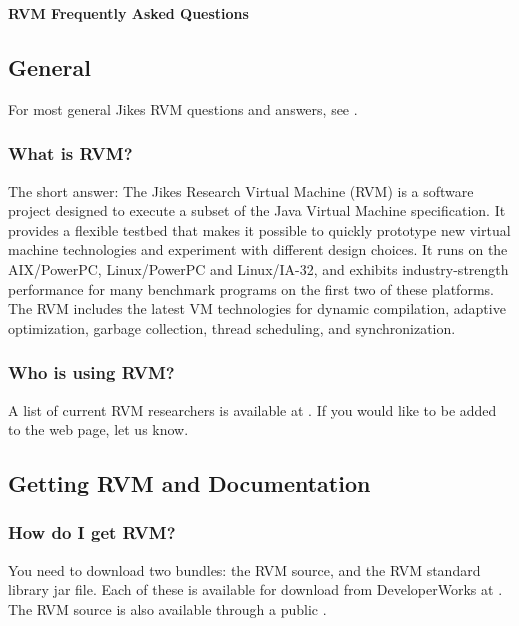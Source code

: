 \begin{center}
{\bf RVM Frequently Asked Questions}
\end{center}

\subsection{General}

For most general Jikes RVM questions and answers, see
\xlink{{\tt \QandAURL}}{\QandAURL}.

\subsubsection{What is RVM?}

The short answer:
The Jikes Research Virtual Machine (RVM) is a software project designed to 
execute a subset of the Java Virtual Machine specification.  It provides a
flexible testbed that makes it possible to quickly prototype new
virtual machine technologies and experiment with different design
choices.  It runs on the AIX/PowerPC, Linux/PowerPC and Linux/IA-32,
and exhibits industry-strength performance for many benchmark programs
on the first two of these platforms.  The RVM includes the latest VM
technologies for dynamic compilation, adaptive optimization, garbage
collection, thread scheduling, and synchronization.

\subsubsection{Who is using RVM?}
A list of current RVM researchers is available at
\xlink{{\tt \RVMUserListURL}}{\RVMUserListURL}.  If you would like to 
be added to the web page, let us know.

\subsection{Getting RVM and Documentation}

\subsubsection{How do I get RVM?}

You need to download two bundles: the RVM source, and the RVM standard library
jar file.  Each of these is available for download from DeveloperWorks at
\xlink{{\tt \RVMDownloadURL}}{\RVMDownloadURL}.  
The RVM source is also available through a 
public 
.

